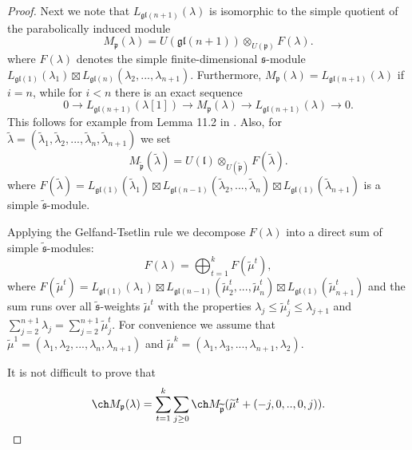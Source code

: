 \documentclass[12pt]{amsart}
\begin{document}
\begin{proof}
Next we note that $L_{\mathfrak{gl}({n+1})}(\lambda)$ is isomorphic to the simple quotient of the parabolically induced module 
$$
M_{\mathfrak p} (\lambda) = U(\mathfrak{gl}({n+1})) \otimes_{U({\mathfrak p})} F(\lambda).
$$
where $F(\lambda)$ denotes the simple finite-dimensional $\mathfrak{s}$-module $L_{\mathfrak{gl}({1})}(\lambda_1) \boxtimes L_{\mathfrak{gl}({n})}(\lambda_2,...,\lambda_{n+1})$. Furthermore, $M_{\mathfrak p} (\lambda) = L_{\mathfrak{gl}({n+1})}(\lambda)$ if $i=n$, while for $i<n$ there is an exact sequence
$$
0 \to L_{\mathfrak{gl}({n+1})}(\lambda [1]) \to M_{\mathfrak{p}}(\lambda) \to L_{\mathfrak{gl}({n+1})}(\lambda) \to 0.
$$
This follows for example from Lemma 11.2 in \cite{M}.
Also, for $\widetilde{\lambda} = (\widetilde{\lambda}_1, \widetilde{\lambda}_2,..., \widetilde{\lambda}_n,  \widetilde{\lambda}_{n+1})$ we set 
$$
M_{\widetilde{\mathfrak p}} (\widetilde{\lambda}) = U(\mathfrak{l}) \otimes_{U({\widetilde{\mathfrak p}})} F(\widetilde{\lambda}).
$$
where $F(\widetilde{\lambda})= L_{\mathfrak{gl}({1})}(\widetilde{\lambda}_1) \boxtimes L_{\mathfrak{gl}({n-1})}(\widetilde{\lambda}_2,..., \widetilde{\lambda}_{n})  \boxtimes  L_{\mathfrak{gl}({1})}(\widetilde{\lambda}_{n+1})$ is a simple $\widetilde{\mathfrak s}$-module.

Applying the Gelfand-Tsetlin rule  we  decompose $F(\lambda)$ into a direct sum of simple $\widetilde{\mathfrak s}$-modules:
$$
F (\lambda) = \bigoplus_{t=1}^kF(\widetilde{\mu}^t),
$$
where $F(\widetilde{\mu}^t) = L_{\mathfrak{gl}({1})}(\lambda_1) \boxtimes L_{\mathfrak{gl}({n-1})}(\widetilde{\mu}^t_2,..., \widetilde{\mu}^t_{n})  \boxtimes  L_{\mathfrak{gl}({1})}(\widetilde{\mu}^t_{n+1})$ and the sum runs over all $\widetilde{\mathfrak s}$-weights $\widetilde{\mu}^t$ with the properties $\lambda_j \leq \widetilde{\mu}^t_j \leq \lambda_{j+1}$ and $\sum_{j=2}^{n+1} \lambda_j = \sum_{j=2}^{n+1} \widetilde{\mu}^t_j$. For convenience we assume that $\widetilde{\mu}^1 = (\lambda_1, \lambda_2,...,\lambda_n, \lambda_{n+1})$ and $\widetilde{\mu}^k = (\lambda_1,\lambda_3,...,\lambda_{n+1}, \lambda_{2})$.

It is not difficult to prove that
$$
\ch M_{\mathfrak p} (\lambda) = \sum_{t=1}^k \sum_{j\geq 0} \ch M_{\widetilde{\mathfrak p}} (\widetilde{\mu}^t + (-j,0,..,0,j)).
$$


\end{proof}
\end{document}
